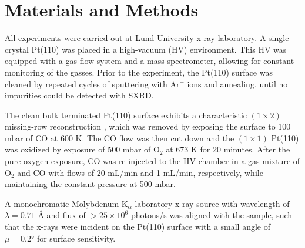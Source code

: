 \documentclass[aps,prl,groupedaddress,twocolumn]{revtex4-1}
\begin{document}



\section{Materials and Methods}
All experiments were carried out at Lund University x-ray laboratory. A single crystal Pt(110) was placed in a high-vacuum (HV) environment. This HV was equipped with a gas flow system and a mass spectrometer, allowing for constant monitoring of the gasses. Prior to the experiment, the Pt(110) surface was cleaned by repeated cycles of sputtering with Ar$^+$ ions and annealing, until no impurities could be detected with SXRD. 

The clean bulk terminated Pt(110) surface exhibits a characteristic $(1\times2)$ missing-row reconstruction \cite{VLIEG_missing_row}, which was removed by exposing the surface to 100 mbar of CO at 600 K\cite{CO_induced_back_relax}. The CO flow was then cut down and the $(1\times1)$ Pt(110) was oxidized by exposure of 500 mbar of O$_2$ at 673 K for 20 minutes. After the pure oxygen exposure, CO was re-injected to the HV chamber in a gas mixture of O$_2$ and CO with flows of 20 mL/min and 1 mL/min, respectively, while maintaining the constant pressure at 500 mbar. 

A monochromatic Molybdenum K$_{\alpha}$ laboratory x-ray source with wavelength of $\lambda = 0.71$ Å and flux of $>25\times10^6$ photons/s was aligned with the sample, such that the x-rays were incident on the Pt(110) surface with a small angle of $\mu=0.2\si{\degree}$ for surface sensitivity.
\end{document}

